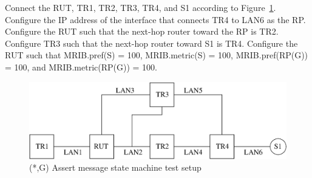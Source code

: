 \documentclass[11pt]{report}
\begin{document}
Connect the RUT, TR1, TR2, TR3, TR4, and S1 according to
Figure~\ref{fig:pim_test_5_2_wc_assert_message_state_machine}.
Configure the IP address of the interface that connects TR4 to LAN6 as the RP.
Configure the RUT such that the next-hop router toward the RP is TR2.
Configure TR3 such that the next-hop router toward S1 is TR4.
Configure the RUT such that MRIB.pref(S) = 100, MRIB.metric(S) = 100,
MRIB.pref(RP(G)) = 100, and MRIB.metric(RP(G)) = 100.

\begin{figure}[htbp]
  \begin{center}
    \includegraphics[scale=0.8]{figs/pim_test_5_2_wc_assert_message_state_machine}
    \caption{(*,G) Assert message state machine test setup}
    \label{fig:pim_test_5_2_wc_assert_message_state_machine}
  \end{center}
\end{figure}


\end{document}
